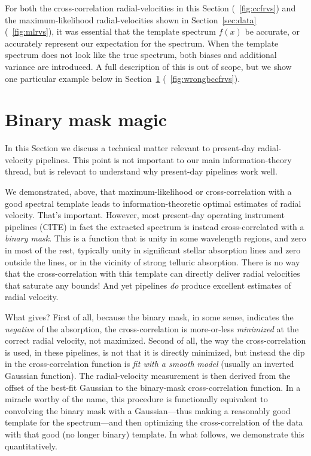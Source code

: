 \documentclass[modern]{aastex631}
\newcommand{\sectionname}{Section}
\newcommand{\secref}[1]{\sectionname~\ref{#1}}
\newcommand{\figref}[1]{\figurename~\ref{#1}}
\begin{document}
For both the cross-correlation radial-velocities in this \sectionname{} (\figref{fig:ccfrvs}) and the maximum-likelihood radial-velocities shown in \secref{sec:data} (\figref{fig:mlrvs}), it was essential that the template spectrum $f(x)$ be accurate, or accurately represent our expectation for the spectrum.
When the template spectrum does not look like the true spectrum, both biases and additional variance are introduced.
A full description of this is out of scope, but we show one particular example below in \secref{sec:binary} (\figref{fig:wrongbccfrvs}).

\section{Binary mask magic}\label{sec:binary}

In this \sectionname{} we discuss a technical matter relevant to present-day radial-velocity pipelines.
This point is not important to our main information-theory thread, but is relevant to understand why present-day pipelines work well.

We demonstrated, above, that maximum-likelihood or cross-correlation with a good spectral template leads to information-theoretic optimal estimates of radial velocity.
That's important.
However, most present-day operating instrument pipelines (CITE) in fact the extracted spectrum is instead cross-correlated with a \emph{binary mask}.
This is a function that is unity in some wavelength regions, and zero in most of the rest, typically unity in significant stellar absorption lines and zero outside the lines, or in the vicinity of strong telluric absorption.
There is no way that the cross-correlation with this template can directly deliver radial velocities that saturate any bounds!
And yet pipelines \emph{do} produce excellent estimates of radial velocity.

What gives?
First of all, because the binary mask, in some sense, indicates the \emph{negative} of the absorption, the cross-correlation is more-or-less \emph{minimized} at the correct radial velocity, not maximized.
Second of all, the way the cross-correlation is used, in these pipelines, is not that it is directly minimized, but instead the dip in the cross-correlation function is \emph{fit with a smooth model} (usually an inverted Gaussian function).
The radial-velocity measurement is then derived from the offset of the best-fit Gaussian to the binary-mask cross-correlation function.
In a miracle worthy of the name, this procedure is functionally equivalent to convolving the binary mask with a Gaussian---thus making a reasonably good template for the spectrum---and then optimizing the cross-correlation of the data with that good (no longer binary) template.
In what follows, we demonstrate this quantitatively.
\end{document}
